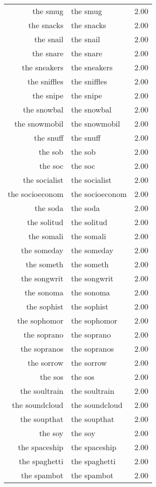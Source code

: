 \begin{table}[ht]
\begin{tabular}{rlr}
  the smug & the smug & 2.00 \\ 
  the snacks & the snacks & 2.00 \\ 
  the snail & the snail & 2.00 \\ 
  the snare & the snare & 2.00 \\ 
  the sneakers & the sneakers & 2.00 \\ 
  the sniffles & the sniffles & 2.00 \\ 
  the snipe & the snipe & 2.00 \\ 
  the snowbal & the snowbal & 2.00 \\ 
  the snowmobil & the snowmobil & 2.00 \\ 
  the snuff & the snuff & 2.00 \\ 
  the sob & the sob & 2.00 \\ 
  the soc & the soc & 2.00 \\ 
  the socialist & the socialist & 2.00 \\ 
  the socioeconom & the socioeconom & 2.00 \\ 
  the soda & the soda & 2.00 \\ 
  the solitud & the solitud & 2.00 \\ 
  the somali & the somali & 2.00 \\ 
  the someday & the someday & 2.00 \\ 
  the someth & the someth & 2.00 \\ 
  the songwrit & the songwrit & 2.00 \\ 
  the sonoma & the sonoma & 2.00 \\ 
  the sophist & the sophist & 2.00 \\ 
  the sophomor & the sophomor & 2.00 \\ 
  the soprano & the soprano & 2.00 \\ 
  the sopranos & the sopranos & 2.00 \\ 
  the sorrow & the sorrow & 2.00 \\ 
  the sos & the sos & 2.00 \\ 
  the soultrain & the soultrain & 2.00 \\ 
  the soundcloud & the soundcloud & 2.00 \\ 
  the soupthat & the soupthat & 2.00 \\ 
  the soy & the soy & 2.00 \\ 
  the spaceship & the spaceship & 2.00 \\ 
  the spaghetti & the spaghetti & 2.00 \\ 
  the spambot & the spambot & 2.00 \\ 

\end{tabular}
\end{table}
